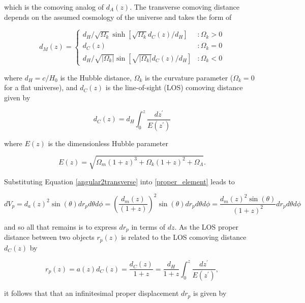 \documentclass[12pt]{article}
\begin{document}
which is the comoving analog of $d_A(z)$. The transverse comoving distance depends on the assumed cosmology of the universe and takes the form of

\begin{equation}\label{comoving_transverse}
d_M(z)=\left\{
     \begin{array}{lr}
       d_H/\sqrt{\Omega_k}\sinh\left[\sqrt{\Omega_k}d_C(z)/d_H\right] & : \Omega_k>0\\
       d_C(z) & : \Omega_k=0\\
       d_H/\sqrt{|\Omega_k|}\sin\left[\sqrt{|\Omega_k|}d_C(z)/d_H\right] & : \Omega_k<0
     \end{array}
   \right.
\end{equation}

where $d_H=c/H_0$ is the Hubble distance, $\Omega_k$ is the curvature parameter ($\Omega_k=0$ for a flat universe), and $d_C(z)$ is the line-of-sight (LOS) comoving distance given by

\begin{equation}\label{comoving_distance}
d_C(z)=d_H\int_0^z\frac{dz^\prime}{E(z^\prime)}
\end{equation}

where $E(z)$ is the dimensionless Hubble parameter

\begin{equation}\label{dim_hubble_parameter}
E(z)=\sqrt{\Omega_m(1+z)^3+\Omega_k(1+z)^2+\Omega_\Lambda}.
\end{equation}

Substituting Equation \eqref{angular2transverse} into \eqref{proper_element} leads to

\begin{equation}\label{temp_solution}
dV_p=d_a(z)^2\sin(\theta)dr_pd\theta d\phi=\left(\frac{d_m(z)}{(1+z)}\right)^2\sin(\theta)dr_pd\theta d\phi=\frac{d_m(z)^2\sin(\theta)}{(1+z)^2}dr_pd\theta d\phi
\end{equation}

and so all that remains is to express $dr_p$ in terms of $dz$. As the LOS proper distance between two objects $r_p(z)$ is related to the LOS comoving distance $d_C(z)$ by

\begin{equation}\label{physical2comoving}
r_p(z)=a(z)d_C(z)=\frac{d_C(z)}{1+z}=\frac{d_H}{1+z}\int_0^z\frac{dz^\prime}{E(z^\prime)},
\end{equation}

it follows that that an infinitesimal proper displacement $dr_p$ is given by
\end{document}
